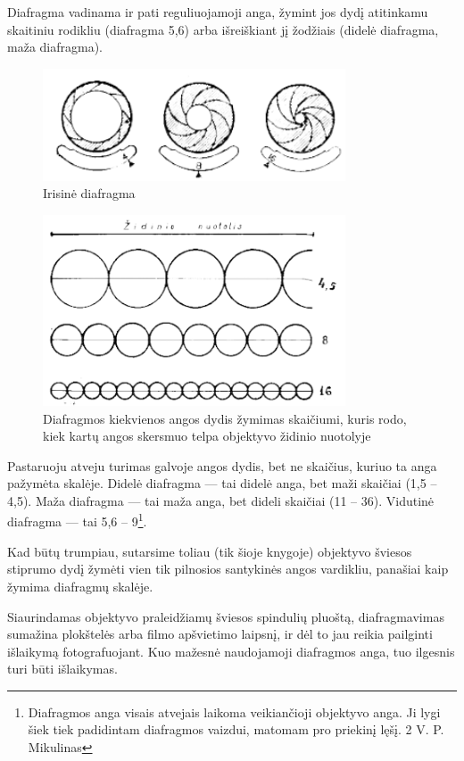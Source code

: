 \documentclass{book}
\begin{document}
					Diafragma vadinama ir pati reguliuojamoji anga, žymint jos dydį atitinkamu skaitiniu rodikliu (diafragma 5,6) arba išreiškiant jį žodžiais (didelė diafragma, maža diafragma).
					\begin{figure}[h]
						\centering
						\includegraphics[width=0.8\textwidth]{3-pav}
						\caption{Irisinė diafragma}
						\label{fig:3}
					\end{figure}
					\begin{figure}[h]
						\centering
						\includegraphics[width=0.8\textwidth]{4-pav}
						\caption{Diafragmos kiekvienos angos dydis žymimas skaičiumi, kuris rodo, kiek kartų angos skersmuo telpa objektyvo židinio nuotolyje}
						\label{fig:4}
					\end{figure}
					Pastaruoju atveju turimas galvoje angos dydis, bet ne skaičius, kuriuo ta anga pažymėta skalėje. Didelė diafragma --- tai didelė anga, bet maži skaičiai (1,5 -- 4,5). Maža diafragma --- tai maža anga, bet dideli skaičiai (11 -- 36). Vidutinė diafragma --- tai 5,6 -- 9\footnote{Diafragmos anga visais atvejais laikoma veikiančioji objektyvo anga. Ji lygi šiek tiek padidintam diafragmos vaizdui, matomam pro priekinį lęšį. 2 V. P. Mikulinas}.

					Kad būtų trumpiau, sutarsime toliau (tik šioje knygoje) objektyvo šviesos stiprumo dydį žymėti vien tik pilnosios santykinės angos vardikliu, panašiai kaip žymima diafragmų skalėje.

					Siaurindamas objektyvo praleidžiamų šviesos spindulių pluoštą, diafragmavimas sumažina plokštelės arba filmo apšvietimo laipsnį, ir dėl to jau reikia pailginti išlaikymą fotografuojant. Kuo mažesnė naudojamoji diafragmos anga, tuo ilgesnis turi būti išlaikymas.
\end{document}
